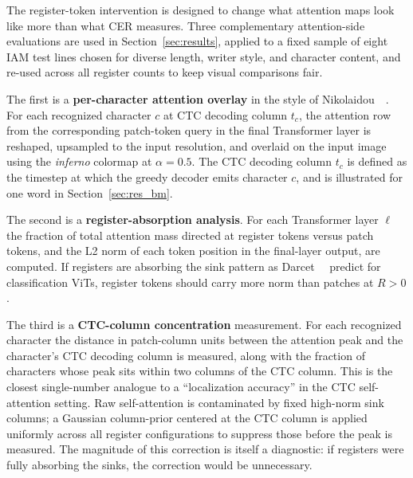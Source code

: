 The register-token intervention is designed to change what attention maps look like more than what CER measures. Three complementary attention-side evaluations are used in Section~\ref{sec:results}, applied to a fixed sample of eight IAM test lines chosen for diverse length, writer style, and character content, and re-used across all register counts to keep visual comparisons fair.

The first is a \textbf{per-character attention overlay} in the style of Nikolaidou~\etal~\cite{nikolaidou2024beyondmem}. For each recognized character $c$ at CTC decoding column $t_c$, the attention row from the corresponding patch-token query in the final Transformer layer is reshaped, upsampled to the input resolution, and overlaid on the input image using the \emph{inferno} colormap at $\alpha = 0.5$. The CTC decoding column $t_c$ is defined as the timestep at which the greedy decoder emits character $c$, and is illustrated for one word in Section~\ref{sec:res_bm}.

The second is a \textbf{register-absorption analysis}. For each Transformer layer $\ell$ the fraction of total attention mass directed at register tokens versus patch tokens, and the L2 norm of each token position in the final-layer output, are computed. If registers are absorbing the sink pattern as Darcet~\etal~\cite{darcet2024registers} predict for classification ViTs, register tokens should carry more norm than patches at $R > 0$.

The third is a \textbf{CTC-column concentration} measurement. For each recognized character the distance in patch-column units between the attention peak and the character's CTC decoding column is measured, along with the fraction of characters whose peak sits within two columns of the CTC column. This is the closest single-number analogue to a ``localization accuracy'' in the CTC self-attention setting. Raw self-attention is contaminated by fixed high-norm sink columns; a Gaussian column-prior centered at the CTC column is applied uniformly across all register configurations to suppress those before the peak is measured. The magnitude of this correction is itself a diagnostic: if registers were fully absorbing the sinks, the correction would be unnecessary.
